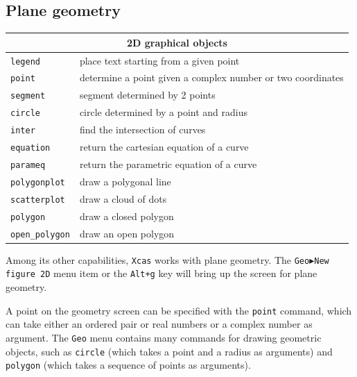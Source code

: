 \documentclass{article}
\begin{document}
\subsection{Plane geometry}

\begin{center}
\begin{tabular}{|p{}|p{}|}
\hline
\multicolumn{2}{|c|}{\bf 2D graphical objects}\\
\hline\hline
\texttt{legend} & place text starting from a given point\\
\texttt{point} & determine a point given a complex number or two
coordinates\\
\texttt{segment} & segment determined by 2 points\\
\texttt{circle} & circle determined by a point and radius\\
\texttt{inter} & find the intersection of curves\\
\texttt{equation} & return the cartesian equation of a curve\\
\texttt{parameq} & return the parametric equation of a curve\\
\texttt{polygonplot} & draw a polygonal line\\
\texttt{scatterplot} & draw a cloud of dots\\
\texttt{polygon} & draw a closed polygon\\
\texttt{open\_polygon} & draw an open polygon\\
\hline
\end{tabular}
\end{center}

Among its other capabilities, \texttt{Xcas} works with plane geometry.
The \texttt{Geo$\blacktriangleright$New figure 2D} menu item or the
\texttt{Alt+g} key will bring up the screen for plane geometry.

A point on the geometry screen can be specified with the
\texttt{point} command, which can take either an ordered pair or real
numbers or a complex number as argument.  The \texttt{Geo} menu
contains many commands for drawing geometric objects, such as
\texttt{circle} (which takes a point and a radius as arguments) and
\texttt{polygon} (which takes a sequence of points as arguments).
\end{document}
